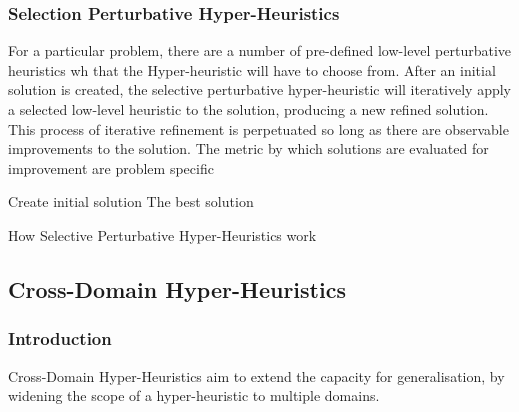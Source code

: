 \documentclass[a4paper,12pt]{article}
\begin{document}
        \subsubsection{Selection Perturbative Hyper-Heuristics}
            \par{
                \noindent
                For a particular problem, there are a number of pre-defined low-level 
                perturbative heuristics wh that the Hyper-heuristic will have to choose from. 
                After an initial solution is created, the selective perturbative hyper-heuristic 
                will iteratively apply a selected low-level heuristic to the solution, producing a new
                refined solution. This process of iterative refinement is perpetuated so long as
                there are observable improvements to the solution. The metric by which solutions are 
                evaluated for improvement are problem specific \newline 
                \newline 
                \begin{algorithm}[H]
                    \SetAlgoLined
                    Create initial solution\;
                    \Return The best solution
                    \caption{How Selective Perturbative Hyper-Heuristics work}
                    \label{alg:sphh}
                \end{algorithm} 
            }
    \newpage
    \subsection{Cross-Domain Hyper-Heuristics}
            \subsubsection{Introduction}
                \par{
                    Cross-Domain Hyper-Heuristics aim to extend the capacity for generalisation,
                    by widening the scope of a hyper-heuristic to multiple domains.\cite{hyperheuristictas}
                }
\end{document}
